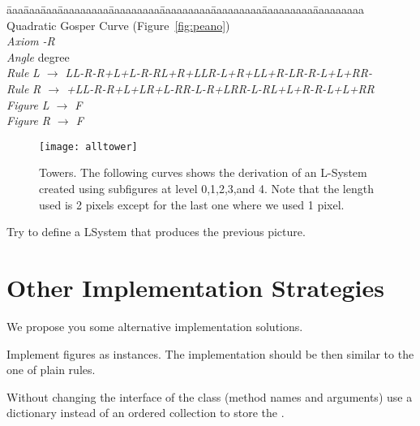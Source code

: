 \begin{tabbing}
\=aaa\=aaa\=aaa\=aaaaaaaaa\=aaaaaaaaa\=aaaaaaaaa\=aaaaaaaaa\=aaaaaaaaa\=aaaaaaaaa\kill
Quadratic Gosper Curve (Figure~\ref{fig:peano})\\
\>\>\>\> \emph{Axiom} \>\>\emph{-R}\\
\>\>\>\> \emph{Angle} \> degree\\
\>\>\>\> \emph{Rule}  \>\>\emph{L $\rightarrow$ LL-R-R+L+L-R-RL+R+LLR-L+R+LL+R-LR-R-L+L+RR-}\\
\>\>\>\> \emph{Rule}  \>\>\emph{R $\rightarrow$ +LL-R-R+L+LR+L-RR-L-R+LRR-L-RL+L+R-R-L+L+RR}\\
\>\>\>\> \emph{Figure}  \>\>\emph{L $\rightarrow$ F}\\
\>\>\>\> \emph{Figure}  \>\>\emph{R $\rightarrow$ F}
\end{tabbing}


\begin{figure}[!htbp]
\centerline{\texttt{[image: alltower]}}
\caption{Towers. The following curves shows the derivation of an L-System created using subfigures at level 0,1,2,3,and 4. Note that the length used is 2 pixels  except for the last one where we used 1 pixel.}
\label{fig:alltower}
\end{figure}


\begin{exonofig}
Try to define a LSystem that produces the previous picture.

\end{exonofig}


\section{Other Implementation Strategies}
We propose you some alternative implementation solutions.

\begin{exonofig}
Implement figures as  instances. The implementation
should be then similar to the one of plain rules.
\end{exonofig}

\begin{exonofig}
Without changing the interface of the class  (method names and
arguments) use a dictionary instead of an ordered collection to store the 
.
\end{exonofig}

